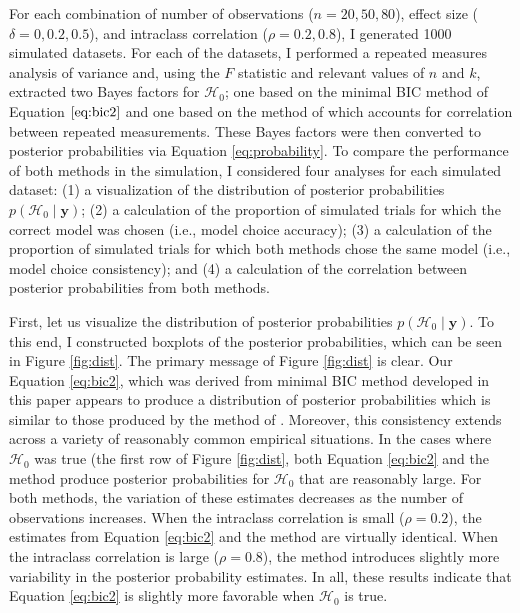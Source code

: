 \documentclass[12pt,twoside,a4paper]{article}
\begin{document}
For each combination of number of observations ($n=20,50,80$), effect size ($\delta=0,0.2,0.5$), and intraclass correlation ($\rho=0.2,0.8$), I generated 1000 simulated datasets. For each of the datasets, I performed a repeated measures analysis of variance and, using the $F$ statistic and relevant values of $n$ and $k$, extracted two Bayes factors for $\mathcal{H}_0$; one based on the minimal BIC method of Equation $\ref{eq:bic2}$ and one based on the method of \citet{nathoo2016} which accounts for correlation between repeated measurements. These Bayes factors were then converted to posterior probabilities via Equation \ref{eq:probability}. To compare the performance of both methods in the simulation, I considered four analyses for each simulated dataset: (1) a visualization of the distribution of posterior probabilities $p(\mathcal{H}_0\mid \bm{y})$; (2) a calculation of the proportion of simulated trials for which the correct model was chosen (i.e., model choice accuracy); (3) a calculation of the proportion of simulated trials for which both methods chose the same model (i.e., model choice consistency); and (4) a calculation of the correlation between posterior probabilities from both methods.

First, let us visualize the distribution of posterior probabilities $p(\mathcal{H}_0\mid \bm{y})$. To this end, I constructed boxplots of the posterior probabilities, which can be seen in Figure \ref{fig:dist}. The primary message of Figure \ref{fig:dist} is clear. Our Equation \ref{eq:bic2}, which was derived from minimal BIC method developed in this paper appears to produce a distribution of posterior probabilities which is similar to those produced by the method of \citet{nathoo2016}. Moreover, this consistency extends across a variety of reasonably common empirical situations. In the cases where $\mathcal{H}_0$ was true (the first row of Figure \ref{fig:dist}, both Equation \ref{eq:bic2} and the \citet{nathoo2016} method produce posterior probabilities for $\mathcal{H}_0$ that are reasonably large. For both methods, the variation of these estimates decreases as the number of observations increases. When the intraclass correlation is small ($\rho=0.2$), the estimates from Equation \ref{eq:bic2} and the \citet{nathoo2016} method are virtually identical. When the intraclass correlation is large ($\rho=0.8$), the \citet{nathoo2016} method introduces slightly more variability in the posterior probability estimates. In all, these results indicate that Equation \ref{eq:bic2} is slightly more favorable when $\mathcal{H}_0$ is true.
\end{document}
